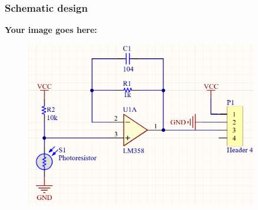 \subsubsection{Schematic design}
\textbf{Your image goes here:}
\begin{figure}[h!]
    \centering
    \includegraphics[width=0.9\textwidth]{graphics/ex4/f6.png}
\end{figure}
\newpage
